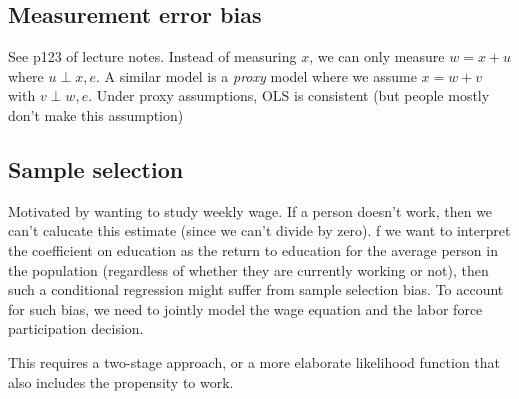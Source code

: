 \documentclass{article}
\begin{document}
\subsection{Measurement error bias}
See p123 of lecture notes. Instead of measuring $x$, we can only measure $w = x + u$ where $u \perp x, e$. A similar model is a \textit{proxy} model where we assume $x = w + v$ with $v \perp w, e$. Under proxy assumptions, OLS is consistent (but people mostly don't make this assumption)

\subsection{Sample selection}
Motivated by wanting to study weekly wage. If a person doesn't work, then we can't calucate this estimate (since we can't divide by zero). f we want to interpret the coefficient on education as the return to education for the average person in the population (regardless of whether they are currently working or not), then such a conditional regression might suffer from sample selection bias. To account for such bias, we need to jointly model the wage equation and the labor force participation decision.

This requires a two-stage approach, or a more elaborate likelihood function that also includes the propensity to work. 
\end{document}
